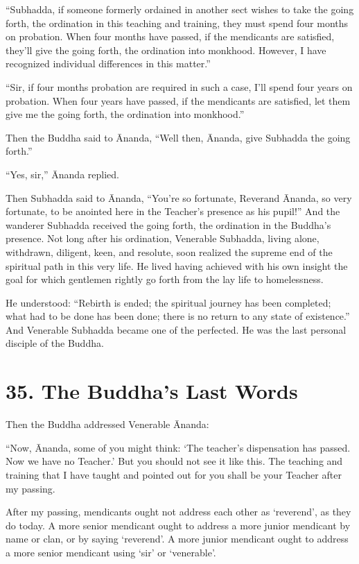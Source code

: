 \documentclass[12pt,openany]{book}%
\begin{document}
“Subhadda, if someone formerly ordained in another sect wishes to take the going forth, the ordination in this teaching and training, they must spend four months on probation. When four months have passed, if the mendicants are satisfied, they’ll give the going forth, the ordination into monkhood. However, I have recognized individual differences in this matter.” 

“Sir, if four months probation are required in such a case, I’ll spend four years on probation. When four years have passed, if the mendicants are satisfied, let them give me the going forth, the ordination into monkhood.” 

Then the Buddha said to Ānanda, “Well then, Ānanda, give Subhadda the going forth.” 

“Yes, sir,” Ānanda replied. 

Then Subhadda said to Ānanda, “You’re so fortunate, Reverand Ānanda, so very fortunate, to be anointed here in the Teacher’s presence as his pupil!” And the wanderer Subhadda received the going forth, the ordination in the Buddha’s presence. Not long after his ordination, Venerable Subhadda, living alone, withdrawn, diligent, keen, and resolute, soon realized the supreme end of the spiritual path in this very life. He lived having achieved with his own insight the goal for which gentlemen rightly go forth from the lay life to homelessness. 

He understood: “Rebirth is ended; the spiritual journey has been completed; what had to be done has been done; there is no return to any state of existence.” And Venerable Subhadda became one of the perfected. He was the last personal disciple of the Buddha. 

\section*{35. The Buddha’s Last Words }

Then the Buddha addressed Venerable Ānanda: 

“Now, Ānanda, some of you might think: ‘The teacher’s dispensation has passed. Now we have no Teacher.’ But you should not see it like this. The teaching and training that I have taught and pointed out for you shall be your Teacher after my passing. 

After my passing, mendicants ought not address each other as ‘reverend’, as they do today. A more senior mendicant ought to address a more junior mendicant by name or clan, or by saying ‘reverend’. A more junior mendicant ought to address a more senior mendicant using ‘sir’ or ‘venerable’. 
\end{document}
